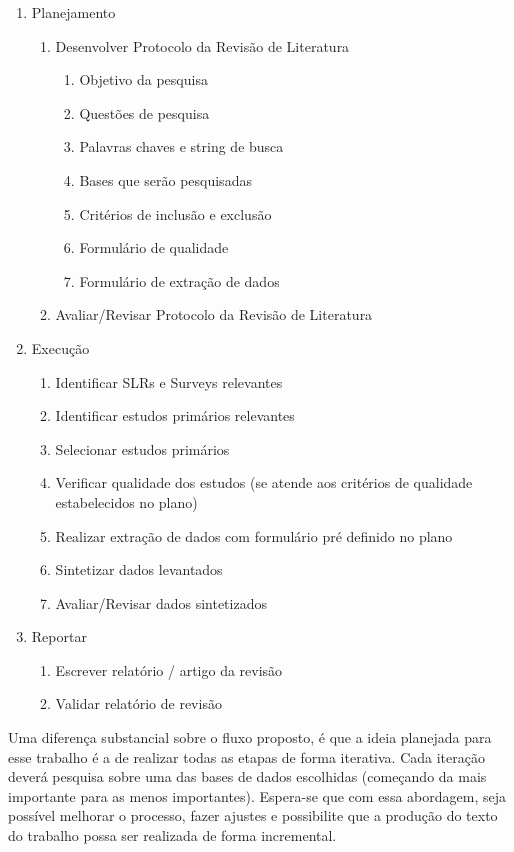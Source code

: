 \begin{enumerate}
    \item Planejamento
    \begin{enumerate}
        \item Desenvolver Protocolo da Revisão de Literatura
            \begin{enumerate}
                \item Objetivo da pesquisa
                \item Questões de pesquisa
                \item Palavras chaves e string de busca
                \item Bases que serão pesquisadas
                \item Critérios de inclusão e exclusão
                \item Formulário de qualidade
                \item Formulário de extração de dados
            \end{enumerate}
        \item Avaliar/Revisar Protocolo da Revisão de Literatura
    \end{enumerate}
    \item Execução
    \begin{enumerate}
        \item Identificar SLRs e Surveys relevantes
        \item Identificar estudos primários relevantes 
        \item Selecionar estudos primários
        \item Verificar qualidade dos estudos (se atende aos critérios de qualidade estabelecidos no plano)
        \item Realizar extração de dados com formulário pré definido no plano
        \item Sintetizar dados levantados
        \item Avaliar/Revisar dados sintetizados
    \end{enumerate}
    \item Reportar 
    \begin{enumerate}
        \item Escrever relatório / artigo da revisão
        \item Validar relatório de revisão
    \end{enumerate}
\end{enumerate}

Uma diferença substancial sobre o fluxo proposto, é que a ideia planejada para esse trabalho é a de realizar todas as etapas de forma iterativa. Cada iteração deverá pesquisa sobre uma das bases de dados escolhidas (começando da mais importante para as menos importantes). Espera-se que com essa abordagem, seja possível melhorar o processo, fazer ajustes e possibilite que a produção do texto do trabalho possa ser realizada de forma incremental.

